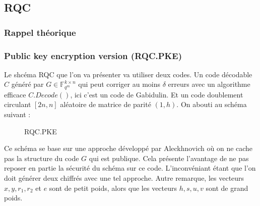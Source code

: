 \documentclass[12pt]{article}
\begin{document}
\subsection{RQC}

\subsubsection{Rappel théorique}

\subsubsection{Public key encryption version (RQC.PKE)}
Le shcéma RQC que l'on va présenter va utiliser deux codes. Un code décodable $C$ généré par $G \in \mathbb{F}_{q^m}^{k \times n}$ qui peut corriger au moins $\delta$ erreurs avec un algorithme efficace $C.Decode()$, ici c'est un code de Gabidulin. Et un code doublement circulant $[2n,n]$ aléatoire de matrice de parité $(1,h)$. On abouti au schéma suivant :

\begin{figure}
    \centering
\noindent{}
    \caption{RQC.PKE}
    \label{fig:RQC.PKE}
\end{figure}
Ce schéma se base sur une approche développé par Aleckhnovich où on ne cache pas la structure du code $G$ qui est publique. Cela présente l'avantage de ne pas reposer en partie la sécurité du schéma sur ce code. L'inconvéniant étant que l'on doit générer deux chiffrés avec une tel approche.
\newline
Autre remarque, les vecteurs $x,y,r_1,r_2$ et $e$ sont de petit poids, alors que les vecteurs $h,s,u,v$ sont de grand poids.
\end{document}

